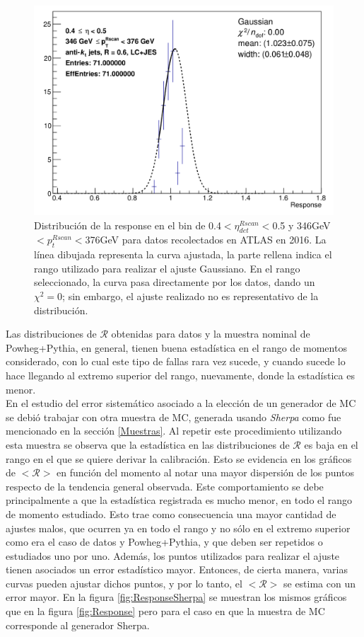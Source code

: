 \begin{figure}[ht]
    \centering
    \includegraphics[width =0.7\linewidth]{images/FitMalo}
    \caption{Distribución de la response en el bin de 0.4$<\eta^{Rscan}_{det}<$0.5 y 346GeV$<p^{Rscan}_{t}<$376GeV para datos recolectados en ATLAS en 2016. La línea dibujada representa la curva ajustada, la parte rellena indica el rango utilizado para realizar el ajuste Gaussiano. En el rango seleccionado, la curva pasa directamente por los datos, dando un $\chi^2=$0; sin embargo, el ajuste realizado no es representativo de la distribución.}
    \label{fig:DistroFitMalo}
\end{figure}

Las distribuciones de $\mathcal{R}$ obtenidas para datos y la muestra nominal de Powheg+Pythia, en general, tienen buena estadística en el rango de momentos considerado, con lo cual este tipo de fallas rara vez sucede, y cuando sucede lo hace llegando al extremo superior del rango, nuevamente, donde la estadística es menor.\\ 

En el estudio del error sistemático asociado a la elección de un generador de MC se debió trabajar con otra muestra de MC, generada usando \textit{Sherpa} como fue mencionado en la sección \ref{Muestras}. Al repetir este procedimiento utilizando esta muestra se observa que la estadística en las distribuciones de $\mathcal{R}$ es baja en el rango en el que se quiere derivar la calibración. Esto se evidencia en los gráficos de $<\mathcal{R}>$ en función del momento al notar una mayor dispersión de los puntos respecto de la tendencia general observada. Este comportamiento se debe principalmente a que la estadística registrada es mucho menor, en todo el rango de momento estudiado. Esto trae como consecuencia una mayor cantidad de ajustes malos, que ocurren ya en todo el rango y no sólo en el extremo superior como era el caso de datos y Powheg+Pythia, y que deben ser repetidos o estudiados uno por uno. Además, los puntos utilizados para realizar el ajuste tienen asociados un error estadístico mayor. Entonces, de cierta manera, varias curvas pueden ajustar dichos puntos, y por lo tanto, el $<\mathcal{R}>$ se estima con un error mayor. En la figura \ref{fig:ResponseSherpa} se muestran los mismos gráficos que en la figura \ref{fig:Response} pero para el caso en que la muestra de MC corresponde al generador Sherpa.\\    

